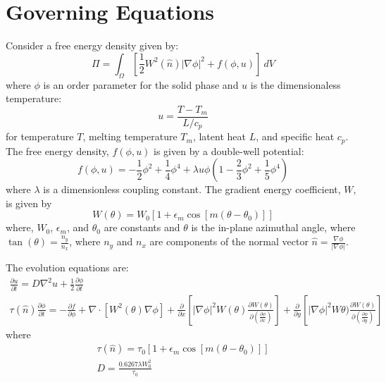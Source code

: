 \documentclass[10pt]{article}
\begin{document}
\section{Governing Equations}

Consider a free energy density given by:
\begin{equation}
  \Pi = \int_{\Omega}   \left[ \frac{1}{2} W^2(\hat{n})|\nabla \phi|^2+f(\phi,u) \right]   ~dV 
\end{equation}
where $\phi$ is an order parameter for the solid phase and $u$ is the dimensionaless temperature:
\begin{equation}
u = \frac{T - T_m}{L/c_p}
\end{equation}
for temperature $T$, melting temperature $T_m$, latent heat $L$, and specific heat $c_p$. The free energy density, $f(\phi,u)$ is given by a double-well potential:
\begin{equation}
f(\phi,u) = -\frac{1}{2}\phi^2 + \frac{1}{4}\phi^4 + \lambda u \phi \left(1-\frac{2}{3} \phi^2+\frac{1}{5}\phi^4 \right)
\end{equation}
where $\lambda$ is a dimensionless coupling constant. The gradient energy coefficient, $W$, is given by 
\begin{equation}
W(\theta) = W_0 [1+\epsilon_m \cos[m(\theta-\theta_0)]]
\end{equation}
where, $W_0$, $\epsilon_m$, and $\theta_0$ are constants and $\theta$ is the in-plane azimuthal angle, where $\tan(\theta) = \frac{n_y}{n_x}$, where $n_y$ and $n_x$ are components of the normal vector $\hat{n} = \frac{\nabla \phi}{|\nabla \phi|}$.

The evolution equations are:
\begin{gather}
\frac{\partial u}{\partial t} = D \nabla^2 u + \frac{1}{2}  \frac{\partial \phi}{\partial t} \\
\tau(\hat{n}) \frac{\partial \phi}{\partial t} = -\frac{\partial f}{\partial \phi} + \nabla \cdot \left[W^2(\theta) \nabla \phi \right]+  \frac{\partial}{\partial x} \left[ |\nabla \phi|^2 W(\theta) \frac{\partial W(\theta)}{\partial \left( \frac{\partial \phi}{\partial x} \right)} \right] + \frac{\partial}{\partial y} \left[ |\nabla \phi|^2 W\theta) \frac{\partial W(\theta)}{\partial \left( \frac{\partial \phi}{\partial y} \right)} \right] 
\end{gather}
where
\begin{gather}
\tau(\hat{n}) = \tau_0 [1+\epsilon_m \cos[m(\theta-\theta_0)]] \\
D = \frac{0.6267 \lambda W_0^2}{\tau_0}
\end{gather}
\end{document}
